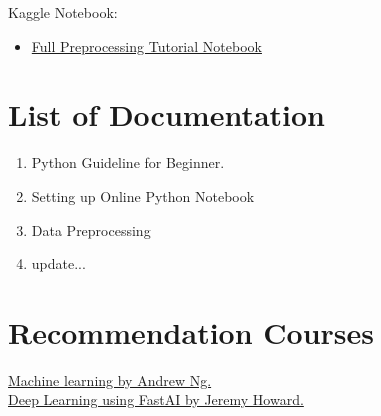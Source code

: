 \documentclass[a4paper,10pt]{article}
\begin{document}
Kaggle Notebook:

\begin{itemize}
	\item \href{https://www.kaggle.com/gzuidhof/full-preprocessing-tutorial}{Full Preprocessing Tutorial Notebook}

\end{itemize}


\section{List of Documentation}

\begin{enumerate}
  \item Python Guideline for Beginner.
  \item Setting up Online Python Notebook
  \item Data Preprocessing
  \item update...
\end{enumerate}

\vspace{1cm}
\vspace{1cm}





\section{Recommendation Courses}

\href{https://www.coursera.org/learn/machine-learning}{Machine learning by Andrew Ng.}\\
\href{https://www.usfca.edu/data-institute/certificates/deep-learning-part-one}{Deep Learning using FastAI  by Jeremy Howard.}




\printbibliography
\end{document}
